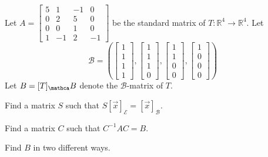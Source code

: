 \documentclass[english,9pt,xcolor=dvipsnames,notheorems]{beamer}
\begin{document}
\begin{frame}
 \vspace{-5 cm}
 
 \hline
 \vspace{1 cm}
Let $A=\begin{bmatrix}
			    5&1&-1&0\\0&2&5&0\\0&0&1&0\\1&-1&2&-1
			\end{bmatrix}$ be the standard matrix of $T:\mathbb R^4\to \mathbb R^4$. Let $$\mathcal B=(\begin{bmatrix}
			    1\\1\\1\\1
			\end{bmatrix}, \begin{bmatrix}
			    1\\1\\1\\0
			\end{bmatrix}, \begin{bmatrix}
			    1\\1\\0\\0
			\end{bmatrix},\begin{bmatrix}
			    1\\0\\0\\0
			\end{bmatrix})$$ Let $B=[T]_\mathca B$ denote the $\mathcal B$-matrix of $T$. 

 Find a matrix $S$ such that $S[\vec x]_{\mathcal E}=[\vec x]_{\mathcal B}$. \\
\vspace{1 cm}


 Find a matrix $C$ such that $C^{-1}AC=B$.\\ 
 \vspace{1 cm}

 
Find $B$ in two different ways. \\
\vspace{1 cm}



\end{frame}

\begin{frame}

    
\end{frame}
\end{document}
